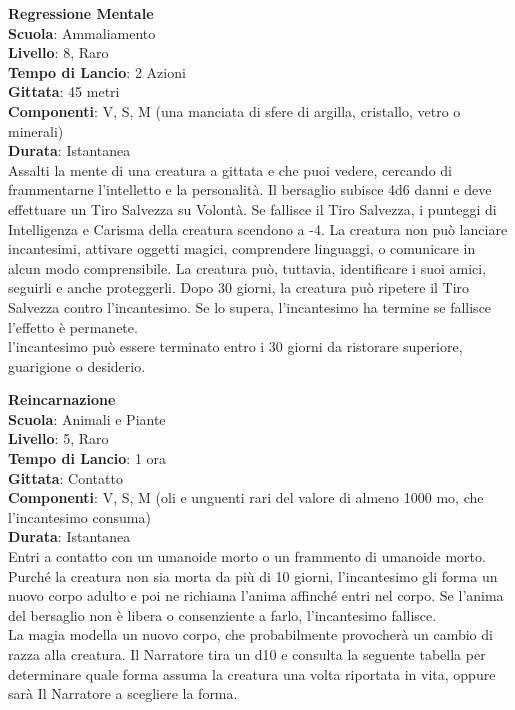 \begin{multicols}{2}
\medskip\textbf{Regressione Mentale}\\
\textbf{Scuola}: Ammaliamento\\
\textbf{Livello}: 8, Raro\\
\textbf{Tempo di Lancio}: 2 Azioni\\
\textbf{Gittata}: 45 metri\\
\textbf{Componenti}: V, S, M (una manciata di sfere di argilla, cristallo, vetro o minerali)\\
\textbf{Durata}: Istantanea\\
Assalti la mente di una creatura a gittata e che puoi vedere, cercando di frammentarne l'intelletto e la personalità. Il bersaglio subisce 4d6 danni e deve effettuare un Tiro Salvezza su Volontà. Se fallisce il Tiro Salvezza, i punteggi di Intelligenza e Carisma della creatura scendono a -4. La creatura non può lanciare incantesimi, attivare oggetti magici, comprendere linguaggi, o comunicare in alcun modo comprensibile. La creatura può, tuttavia, identificare i suoi amici, seguirli e anche proteggerli. Dopo 30 giorni, la creatura può ripetere il Tiro Salvezza contro l'incantesimo. Se lo supera, l'incantesimo ha termine se fallisce l'effetto è permanete.\\
l'incantesimo può essere terminato entro i 30 giorni da ristorare superiore, guarigione o desiderio.

\medskip\textbf{Reincarnazione}\\
\textbf{Scuola}: Animali e Piante\\
\textbf{Livello}: 5, Raro\\
\textbf{Tempo di Lancio}: 1 ora\\
\textbf{Gittata}: Contatto\\
\textbf{Componenti}: V, S, M (oli e unguenti rari del valore di almeno 1000 mo, che l'incantesimo consuma)\\
\textbf{Durata}: Istantanea\\
Entri a contatto con un umanoide morto o un frammento di umanoide morto. Purché la creatura non sia morta da più di 10 giorni, l'incantesimo gli forma un nuovo corpo adulto e poi ne richiama l'anima affinché entri nel corpo. Se l'anima del bersaglio non è libera o consenziente a farlo, l'incantesimo fallisce.\\
La magia modella un nuovo corpo, che probabilmente provocherà un cambio di razza alla creatura. Il Narratore tira un d10 e consulta la seguente tabella per determinare quale forma assuma la creatura una volta riportata in vita, oppure sarà Il Narratore a scegliere la forma.\\


\end{multicols}
